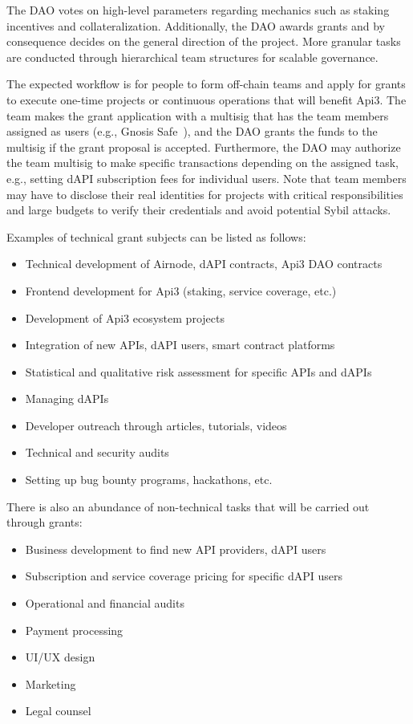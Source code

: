 \documentclass[11pt]{article}
\begin{document}
The DAO votes on high-level parameters regarding mechanics such as staking incentives and collateralization.
Additionally, the DAO awards grants and by consequence decides on the general direction of the project.
More granular tasks are conducted through hierarchical team structures for scalable governance.

The expected workflow is for people to form off-chain teams and apply for grants to execute one-time projects or continuous operations that will benefit Api3.
The team makes the grant application with a multisig that has the team members assigned as users (e.g., Gnosis Safe~\cite{gnosis}), and the DAO grants the funds to the multisig if the grant proposal is accepted.
Furthermore, the DAO may authorize the team multisig to make specific transactions depending on the assigned task, e.g., setting dAPI subscription fees for individual users.
Note that team members may have to disclose their real identities for projects with critical responsibilities and large budgets to verify their credentials and avoid potential Sybil attacks.

Examples of technical grant subjects can be listed as follows:
\begin{itemize}
    \item Technical development of Airnode, dAPI contracts, Api3 DAO contracts
    \item Frontend development for Api3 (staking, service coverage, etc.)
    \item Development of Api3 ecosystem projects
    \item Integration of new APIs, dAPI users, smart contract platforms
    \item Statistical and qualitative risk assessment for specific APIs and dAPIs
    \item Managing dAPIs
    \item Developer outreach through articles, tutorials, videos
    \item Technical and security audits
    \item Setting up bug bounty programs, hackathons, etc.
\end{itemize}

There is also an abundance of non-technical tasks that will be carried out through grants:
\begin{itemize}
    \item Business development to find new API providers, dAPI users
    \item Subscription and service coverage pricing for specific dAPI users
    \item Operational and financial audits
    \item Payment processing
    \item UI/UX design
    \item Marketing
    \item Legal counsel
\end{itemize}
\end{document}
